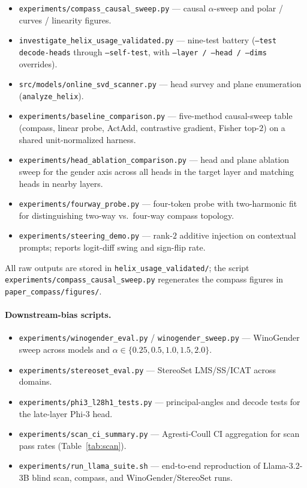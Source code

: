 \begin{itemize}
    \item \texttt{experiments/compass\_causal\_sweep.py} --- causal
    $\alpha$-sweep and polar / curves / linearity figures.
    \item \texttt{investigate\_helix\_usage\_validated.py} --- nine-test
    battery (\texttt{--test decode-heads} through \texttt{--self-test},
    with \texttt{--layer / --head / --dims} overrides).
    \item \texttt{src/models/online\_svd\_scanner.py} --- head survey and
    plane enumeration (\texttt{analyze\_helix}).
    \item \texttt{experiments/baseline\_comparison.py} --- five-method
    causal-sweep table (compass, linear probe, ActAdd, contrastive
    gradient, Fisher top-$2$) on a shared unit-normalized harness.
    \item \texttt{experiments/head\_ablation\_comparison.py} --- head
    and plane ablation sweep for the gender axis across all heads in
    the target layer and matching heads in nearby layers.
    \item \texttt{experiments/fourway\_probe.py} --- four-token probe
    with two-harmonic fit for distinguishing two-way vs.\ four-way
    compass topology.
    \item \texttt{experiments/steering\_demo.py} --- rank-$2$ additive
    injection on contextual prompts; reports logit-diff swing and
    sign-flip rate.
\end{itemize}

All raw outputs are stored in \texttt{helix\_usage\_validated/}; the
script \texttt{experiments/compass\_causal\_sweep.py} regenerates the
compass figures in \texttt{paper\_compass/figures/}.

\paragraph{Downstream-bias scripts.}
\begin{itemize}
    \item \texttt{experiments/winogender\_eval.py} /
    \texttt{winogender\_sweep.py} --- WinoGender sweep across models and
    $\alpha \in \{0.25, 0.5, 1.0, 1.5, 2.0\}$.
    \item \texttt{experiments/stereoset\_eval.py} --- StereoSet LMS/SS/ICAT
    across domains.
    \item \texttt{experiments/phi3\_l28h1\_tests.py} --- principal-angles
    and decode tests for the late-layer Phi-3 head.
    \item \texttt{experiments/scan\_ci\_summary.py} --- Agresti-Coull CI
    aggregation for scan pass rates (Table~\ref{tab:scan}).
    \item \texttt{experiments/run\_llama\_suite.sh} --- end-to-end reproduction
    of Llama-3.2-3B blind scan, compass, and WinoGender/StereoSet runs.
\end{itemize}


